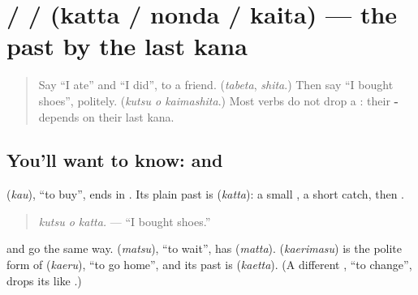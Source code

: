 \section[\texorpdfstring{\ja{かった} / \ja{のんだ} … (katta / nonda …)}{かった / のんだ … (katta / nonda …)}]{ /  /  (katta / nonda / kaita) — the past by the last kana}

\label{lesson:JA-C250-katta}



\begin{quote}
Say \textquotedblleft{}I ate\textquotedblright{} and \textquotedblleft{}I did\textquotedblright{}, to a friend. (\emph{tabeta}, \emph{shita}.) Then say \textquotedblleft{}I bought shoes\textquotedblright{}, politely. (\emph{kutsu o kaimashita}.) Most verbs do not drop a \textbf{}: their \textbf{-} depends on their last kana.
\end{quote}

\subsection*{You'll want to know:  and }
\textbf{} (\emph{kau}), \textquotedblleft{}to buy\textquotedblright{}, ends in \textbf{}. Its plain past is \textbf{} (\emph{katta}): a small \textbf{}, a short catch, then \textbf{}.

\begin{quote}
\textbf{ }
\end{quote}

\begin{quote}
\emph{kutsu o katta.} — \textquotedblleft{}I bought shoes.\textquotedblright{}
\end{quote}

\textbf{} and \textbf{} go the same way. \textbf{} (\emph{matsu}), \textquotedblleft{}to wait\textquotedblright{}, has \textbf{} (\emph{matta}). \textbf{} (\emph{kaerimasu}) is the polite form of \textbf{} (\emph{kaeru}), \textquotedblleft{}to go home\textquotedblright{}, and its past is \textbf{} (\emph{kaetta}). (A different , \textquotedblleft{}to change\textquotedblright{}, drops its  like \textbf{}.)

\begin{quote}
\textbf{ }
\end{quote}

